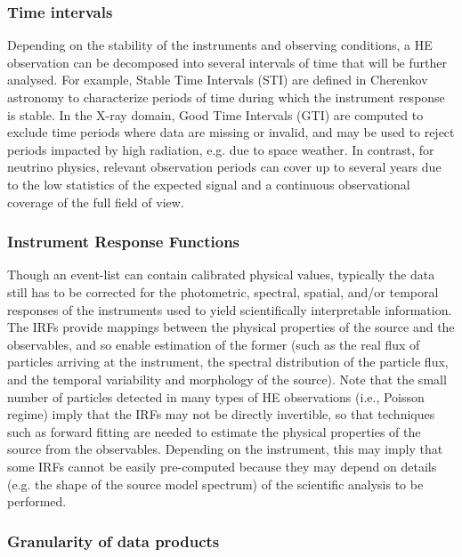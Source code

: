 \documentclass[11pt,a4paper]{ivoa}
\begin{document}
\subsubsection{Time intervals}

Depending on the stability of the instruments and observing conditions, a HE observation can be decomposed into several intervals of time that will be further analysed.
For example, Stable Time Intervals (STI) are defined in Cherenkov astronomy to characterize periods of time during which the instrument response is stable. In the X-ray domain, Good Time Intervals (GTI) are computed to exclude time periods where data are missing or invalid, and may be used to reject periods impacted by high radiation, e.g. due to space weather. In contrast, for neutrino physics, relevant observation periods can cover up to several years due to the low statistics of the expected signal and a continuous observational coverage of the full field of view.


\subsubsection{Instrument Response Functions}

Though an event-list can contain calibrated physical values, typically the data still has to be corrected for the photometric, spectral, spatial, and/or temporal responses of the instruments used to yield scientifically interpretable information. The IRFs provide mappings between the physical properties of the source and the observables, and so enable estimation of the former (such as the real flux of particles arriving at the instrument, the spectral distribution of the particle flux, and the temporal variability and morphology of the source).  Note that the small number of particles detected in many types of HE observations (i.e., Poisson regime) imply that the IRFs may not be directly invertible, so that techniques such as forward fitting are needed to estimate the physical properties of the source from the observables.  Depending on the instrument, this may imply that some IRFs cannot be easily pre-computed because they may depend on details (e.g. the shape of the source model spectrum) of the scientific analysis to be performed.

\subsubsection{Granularity of data products}
\end{document}
